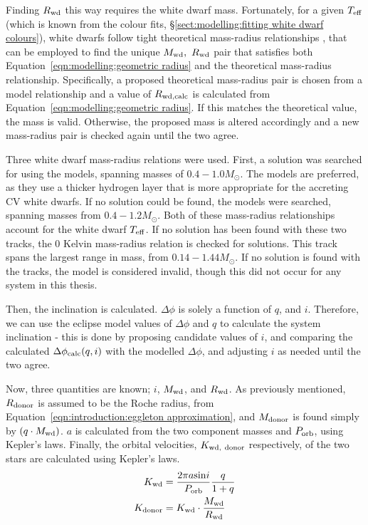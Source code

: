 Finding $R_{\rm wd}$ this way requires the white dwarf mass. Fortunately, for a given $T_{\rm eff}$ (which is known from the colour fits, \S\ref{sect:modelling:fitting white dwarf colours}), white dwarfs follow tight theoretical mass-radius relationships \citep{parsons2017}, that can be employed to find the unique $M_{\rm wd},\ R_{\rm wd}$ pair that satisfies both Equation~\ref{eqn:modelling:geometric radius} and the theoretical mass-radius relationship.
Specifically, a proposed theoretical mass-radius pair is chosen from a model relationship and a value of $R_{\rm wd, calc}$ is calculated from Equation~\ref{eqn:modelling:geometric radius}. If this matches the theoretical value, the mass is valid. Otherwise, the proposed mass is altered accordingly and a new mass-radius pair is checked again until the two agree.

Three white dwarf mass-radius relations were used. First, a solution was searched for using the \citet{wood1995} models, spanning masses of $0.4 - 1.0 M_\odot$. The \citet{wood1995} models are preferred, as they use a thicker hydrogen layer that is more appropriate for the accreting CV white dwarfs.
If no solution could be found, the \citet{panei2000} models were searched, spanning masses from $0.4 - 1.2 M_\odot$.
Both of these mass-radius relationships account for the white dwarf $T_{\rm eff}$.
If no solution has been found with these two tracks, the \citet{hamada1961} 0 Kelvin mass-radius relation is checked for solutions. This track spans the largest range in mass, from $0.14 - 1.44 M_\odot$. If no solution is found with the \citet{hamada1961} tracks, the model is considered invalid, though this did not occur for any system in this thesis.

Then, the inclination is calculated. $\Delta \phi$ is solely a function of $q$, and $i$. Therefore, we can use the eclipse model values of $\Delta\phi$ and $q$ to calculate the system inclination - this is done by proposing candidate values of $i$, and comparing the calculated $\Delta \phi_{\rm calc}(q,i)$ with the modelled $\Delta \phi$, and adjusting $i$ as needed until the two agree.

Now, three quantities are known; $i$, $M_{\rm wd}$, and $R_{\rm wd}$. As previously mentioned, $R_{\rm donor}$ is assumed to be the Roche radius, from Equation~\ref{eqn:introduction:eggleton approximation}, and $M_{\rm donor}$ is found simply by $(q \cdot M_{\rm wd})$. $a$ is calculated from the two component masses and $P_{\rm orb}$, using Kepler's laws. Finally, the orbital velocities, $K_{\rm wd,\ donor}$ respectively, of the two stars are calculated using Kepler's laws.
\begin{align}
    K_{\rm wd} &= \frac{2\pi a \mathrm{sin}i}{P_{\rm orb}} \frac{q}{1+q} \\
    K_{\rm donor} &= K_{\rm wd} \cdot \frac{M_{\rm wd}}{R_{\rm wd}}
\end{align}


